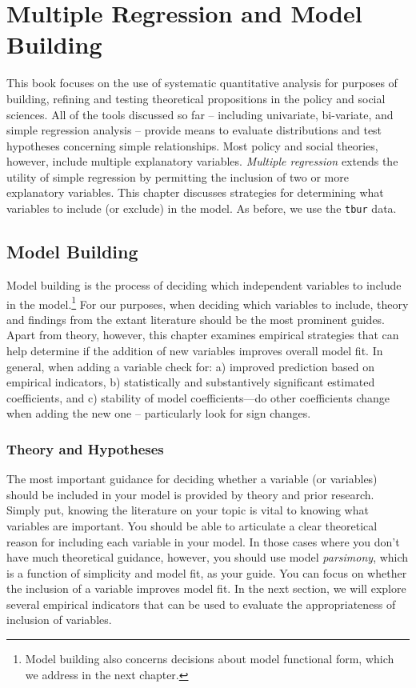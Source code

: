 \documentclass[11pt,openany]{book}\usepackage[]{graphicx}\usepackage[]{color}
\begin{document}
\chapter{Multiple Regression and Model Building} 

This book focuses on the use of systematic quantitative analysis for purposes of building, refining and testing theoretical propositions in the policy and social sciences. All of the tools discussed so far -- including univariate, bi-variate, and simple regression analysis -- provide means to evaluate distributions and test hypotheses concerning simple relationships. Most policy and social theories,  however, include multiple explanatory variables. \textit{Multiple regression} extends the utility of simple regression by permitting the inclusion of two or more explanatory variables.  This chapter discusses strategies for determining what variables to include (or exclude) in the model.  As before, we use the \texttt{tbur} data.  

\section{Model Building}

Model building is the process of deciding which independent variables to include in the model.\footnote{Model building also concerns decisions about model functional form, which we address in the next chapter.} For our purposes, when deciding which variables to include, theory and findings from the extant literature should be the most prominent guides. Apart from theory, however, this chapter examines empirical strategies that can help determine if the addition of new variables improves overall model fit. In general, when adding a variable check for: a) improved prediction based on empirical indicators, b) statistically and substantively significant estimated coefficients, and c) stability of model coefficients---do other coefficients change when adding the new one -- particularly look for sign changes.  

\subsection{Theory and Hypotheses}

The most important guidance for deciding whether a variable (or variables) should be included in your model is provided by theory and prior research. Simply put, knowing the literature on your topic is vital to knowing what variables are important. You should be able to articulate a clear theoretical reason for including each variable in your model. In those cases where you don't have much theoretical guidance, however, you should use model \textit{parsimony}, which is a function of simplicity and model fit, as your guide. You can focus on whether the inclusion of a variable improves model fit.  In the next section, we will explore several empirical indicators that can be used to evaluate the appropriateness of inclusion of variables. 
\end{document}
